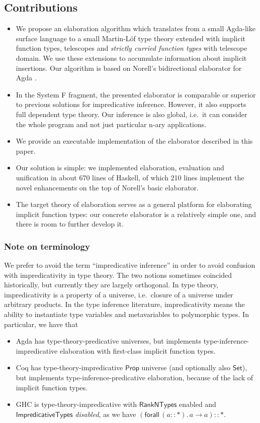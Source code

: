 \documentclass[acmsmall,review,anonymous,prologue,dvipsnames]{acmart}\settopmatter{printfolios=true,printccs=false,printacmref=false}
\newcommand{\kw}[1]{{\mathsf{#1}}}
\theoremstyle{remark}
\begin{document}
\subsection{Contributions}
\begin{itemize}
  \item We propose an elaboration algorithm which translates from a small
    Agda-like surface language to a small Martin-L\"of type theory extended with
    implicit function types, telescopes and \emph{strictly curried function
      types} with telescope domain. We use these extensions to accumulate
    information about implicit insertions. Our algorithm is based on Norell's
    bidirectional elaborator for Agda \cite[Chapter~3]{norell07thesis}.
  \item
    In the System F fragment, the presented elaborator is comparable or superior
    to previous solutions for impredicative inference. However, it also supports
    full dependent type theory. Our inference is also global, i.e.\ it can
    consider the whole program and not just particular n-ary applications.
  \item We provide an executable implementation of the elaborator described in
    this paper.
  \item Our solution is simple: we implemented elaboration,
    evaluation and unification in about 670 lines of Haskell, of which 210 lines
    implement the novel enhancements on the top of Norell's basic elaborator.
  \item The target theory of elaboration serves as a general platform for
    elaborating implicit function types: our concrete elaborator is a relatively
    simple one, and there is room to further develop it.
\end{itemize}

\subsubsection{Note on terminology}

We prefer to avoid the term ``impredicative inference'' in order to avoid
confusion with impredicativity in type theory. The two notions sometimes
coincided historically, but currently they are largely orthogonal. In type
theory, impredicativity is a property of a universe, i.e.\ closure of a universe
under arbitrary products. In the type inference literature, impredicativity
means the ability to instantiate type variables and metavariables to polymorphic
types. In particular, we have that
\begin{itemize}
  \item Agda has type-theory-predicative universes, but implements
    type-inference-impredicative elaboration with first-class implicit function
    types.
  \item Coq has type-theory-impredicative $\kw{Prop}$ universe (and optionally
    also $\kw{Set}$), but implements type-inference-predicative elaboration,
    because of the lack of implicit function types.
  \item GHC is type-theory-impredicative with $\kw{RankNTypes}$ enabled and
    $\kw{ImpredicativeTypes}$ \emph{disabled}, as we have $(\kw{forall}\,(a :: *).\, a
    \to a) :: *$.
\end{itemize}
\end{document}
